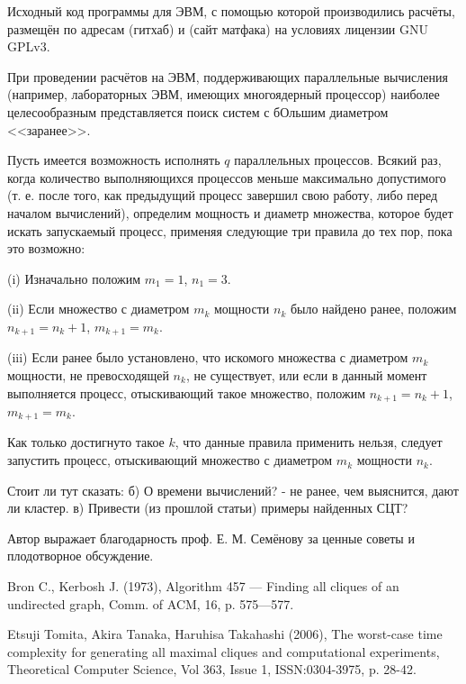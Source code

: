 \documentclass{article}
\begin{document}
Исходный код программы для ЭВМ, с помощью которой производились расчёты, размещён по адресам (гитхаб) и (сайт матфака) на условиях лицензии GNU GPLv3. 


При проведении расчётов на ЭВМ, поддерживающих параллельные вычисления (например, лабораторных ЭВМ, имеющих многоядерный процессор) наиболее целесообразным представляется поиск систем с бОльшим диаметром <<заранее>>.

Пусть имеется возможность исполнять $q$ параллельных процессов.
Всякий раз, когда количество выполняющихся процессов меньше максимально допустимого (т. е. после того, как предыдущий процесс завершил свою работу, либо перед началом вычислений), определим мощность и диаметр множества, которое будет искать запускаемый процесс, применяя следующие три правила до тех пор, пока это возможно:

(i)
Изначально положим $m_1=1$, $n_1=3$.

(ii)
Если множество с диаметром $m_k$ мощности $n_k$ было найдено ранее, положим $n_{k+1} = n_k +1$, $m_{k+1} = m_k$.

(iii)
Если ранее было установлено, что искомого множества с диаметром $m_k$ мощности, не превосходящей $n_k$, не существует,
или если в данный момент выполняется процесс, отыскивающий такое множество, положим $n_{k+1} = n_k +1$, $m_{k+1} = m_k$.

Как только достигнуто такое $k$, что данные правила применить нельзя, следует запустить процесс, отыскивающий множество с диаметром $m_k$ мощности $n_k$.





Стоит ли тут сказать:
б) О времени вычислений? - не ранее, чем выяснится, дают ли кластер.
в) Привести (из прошлой статьи) примеры найденных СЦТ?



Автор выражает благодарность проф. Е. М. Семёнову за ценные советы и плодотворное обсуждение.




\newpage

\begin{thebibliography}{99}

 Bron C., Kerbosh J. (1973), Algorithm 457 — Finding all cliques of an undirected graph, Comm. of ACM, 16, p. 575—577.

 Etsuji Tomita, Akira Tanaka, Haruhisa Takahashi (2006), The worst-case time complexity for generating all maximal cliques and computational experiments, Theoretical Computer Science, Vol 363, Issue 1, ISSN:0304-3975, p. 28-42.

\end{thebibliography}
\end{document}
